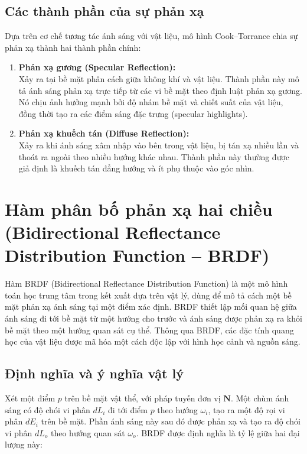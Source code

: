 \subsection{Các thành phần của sự phản xạ}
Dựa trên cơ chế tương tác ánh sáng với vật liệu, mô hình Cook--Torrance chia sự phản xạ thành hai thành phần chính:
\begin{enumerate}
    \item \textbf{Phản xạ gương (Specular Reflection):}\\
    Xảy ra tại bề mặt phân cách giữa không khí và vật liệu. Thành phần này mô tả ánh sáng phản xạ trực tiếp từ các vi bề mặt theo định luật phản xạ gương. Nó chịu ảnh hưởng mạnh bởi độ nhám bề mặt và chiết suất của vật liệu, đồng thời tạo ra các điểm sáng đặc trưng (specular highlights).

    \item \textbf{Phản xạ khuếch tán (Diffuse Reflection):}\\
    Xảy ra khi ánh sáng xâm nhập vào bên trong vật liệu, bị tán xạ nhiều lần và thoát ra ngoài theo nhiều hướng khác nhau. Thành phần này thường được giả định là khuếch tán đẳng hướng và ít phụ thuộc vào góc nhìn.
\end{enumerate}

\section{Hàm phân bố phản xạ hai chiều (Bidirectional Reflectance Distribution Function – BRDF)}

Hàm BRDF (Bidirectional Reflectance Distribution Function) là một mô hình toán học trung tâm trong kết xuất dựa trên vật lý, dùng để mô tả cách một bề mặt phản xạ ánh sáng tại một điểm xác định. BRDF thiết lập mối quan hệ giữa ánh sáng đi tới bề mặt từ một hướng cho trước và ánh sáng được phản xạ ra khỏi bề mặt theo một hướng quan sát cụ thể. Thông qua BRDF, các đặc tính quang học của vật liệu được mã hóa một cách độc lập với hình học cảnh và nguồn sáng.

\subsection{Định nghĩa và ý nghĩa vật lý}

Xét một điểm $p$ trên bề mặt vật thể, với pháp tuyến đơn vị $\mathbf{N}$. Một chùm ánh sáng có độ chói vi phân $dL_i$ đi tới điểm $p$ theo hướng $\omega_i$, tạo ra một độ rọi vi phân $dE_i$ trên bề mặt. Phần ánh sáng này sau đó được phản xạ và tạo ra độ chói vi phân $dL_o$ theo hướng quan sát $\omega_o$. BRDF được định nghĩa là tỷ lệ giữa hai đại lượng này:

